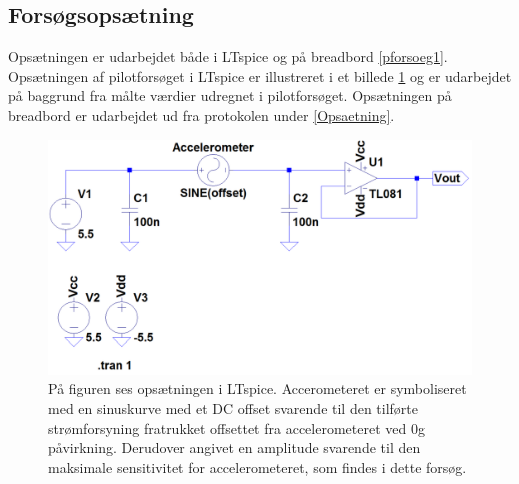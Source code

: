 \subsection{Forsøgsopsætning}
Opsætningen er udarbejdet både i LTspice og på breadbord \ref{pforsoeg1}. Opsætningen af pilotforsøget i LTspice  er illustreret i et billede \ref{pLTspice} og er udarbejdet på baggrund fra målte værdier udregnet i pilotforsøget. Opsætningen på breadbord er udarbejdet ud fra protokolen under \ref{Opsaetning}.  

\begin{figure}[H]
		\centering
		\includegraphics[scale=0.4]{figures/Bilag/Test_opsaetning.PNG}
		\caption{På figuren ses opsætningen i LTspice. Accerometeret er symboliseret med en sinuskurve med et DC offset svarende til den tilførte strømforsyning fratrukket offsettet fra accelerometeret ved $0$g påvirkning. Derudover angivet en amplitude svarende til den maksimale sensitivitet for accelerometeret, som findes i dette forsøg.}
		\label{pLTspice}
\end{figure}

